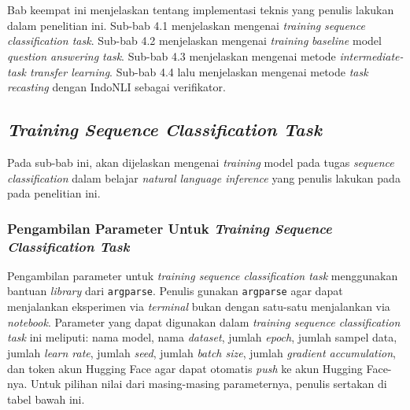 \chapter{\babEmpat}
\label{bab:4}
Bab keempat ini menjelaskan tentang implementasi teknis yang penulis lakukan dalam penelitian ini. Sub-bab 4.1 menjelaskan mengenai \emph{training} \emph{sequence classification task}. Sub-bab 4.2 menjelaskan mengenai  \emph{training} \emph{baseline} model \emph{question answering task}. Sub-bab 4.3 menjelaskan mengenai metode \emph{intermediate-task transfer learning}. Sub-bab 4.4 lalu menjelaskan mengenai metode \emph{task recasting} dengan IndoNLI sebagai verifikator.

\section{\emph{Training} \emph{Sequence Classification Task}}
Pada sub-bab ini, akan dijelaskan mengenai \emph{training} model pada tugas \emph{sequence classification} dalam belajar \emph{natural language inference} yang penulis lakukan pada pada penelitian ini. 

\subsection{Pengambilan Parameter Untuk \emph{Training Sequence Classification Task}}
Pengambilan parameter untuk \emph{training sequence classification task} menggunakan bantuan \emph{library} dari \texttt{argparse}. Penulis gunakan \texttt{argparse} agar dapat menjalankan eksperimen via \emph{terminal} bukan dengan satu-satu menjalankan via \emph{notebook}. Parameter yang dapat digunakan dalam \emph{training sequence classification task} ini meliputi: nama model, nama \emph{dataset}, jumlah \emph{epoch}, jumlah sampel data, jumlah \emph{learn rate}, jumlah \emph{seed}, jumlah \emph{batch size}, jumlah \emph{gradient accumulation}, dan token akun Hugging Face agar dapat otomatis \emph{push} ke akun Hugging Face-nya. Untuk pilihan nilai dari masing-masing parameternya, penulis sertakan di tabel bawah ini.

